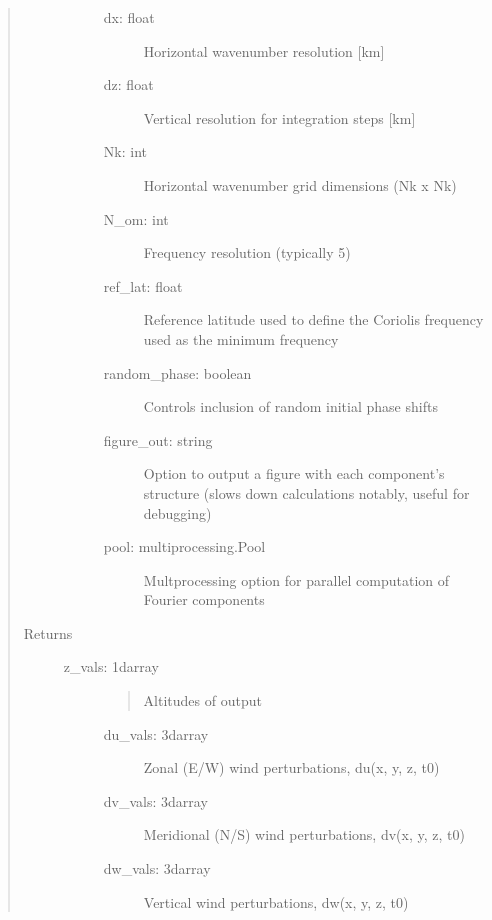 \documentclass[letterpaper,10pt,english]{sphinxmanual}
\begin{document}
\begin{fulllineitems}
\begin{quote}
\begin{description}
\begin{description}
\begin{description}
\item[{dx: float}] \leavevmode
\sphinxAtStartPar
Horizontal wavenumber resolution {[}km{]}

\item[{dz: float}] \leavevmode
\sphinxAtStartPar
Vertical resolution for integration steps {[}km{]}

\item[{Nk: int}] \leavevmode
\sphinxAtStartPar
Horizontal wavenumber grid dimensions (Nk x Nk)

\item[{N\_om: int}] \leavevmode
\sphinxAtStartPar
Frequency resolution (typically 5)

\item[{ref\_lat: float}] \leavevmode
\sphinxAtStartPar
Reference latitude used to define the Coriolis frequency used as the minimum frequency

\item[{random\_phase: boolean}] \leavevmode
\sphinxAtStartPar
Controls inclusion of random initial phase shifts

\item[{figure\_out: string}] \leavevmode
\sphinxAtStartPar
Option to output a figure with each component’s structure (slows down calculations notably, useful for debugging)

\item[{pool: multiprocessing.Pool}] \leavevmode
\sphinxAtStartPar
Multprocessing option for parallel computation of Fourier components

\end{description}

\end{description}

\item[{Returns}] \leavevmode\begin{description}
\item[{z\_vals: 1darray}] \leavevmode\begin{quote}

\sphinxAtStartPar
Altitudes of output
\end{quote}
\begin{description}
\item[{du\_vals: 3darray}] \leavevmode
\sphinxAtStartPar
Zonal (E/W) wind perturbations, du(x, y, z, t0)

\item[{dv\_vals: 3darray}] \leavevmode
\sphinxAtStartPar
Meridional (N/S) wind perturbations, dv(x, y, z, t0)

\item[{dw\_vals: 3darray}] \leavevmode
\sphinxAtStartPar
Vertical wind perturbations, dw(x, y, z, t0)

\end{description}

\end{description}

\end{description}\end{quote}

\end{fulllineitems}
\end{document}
